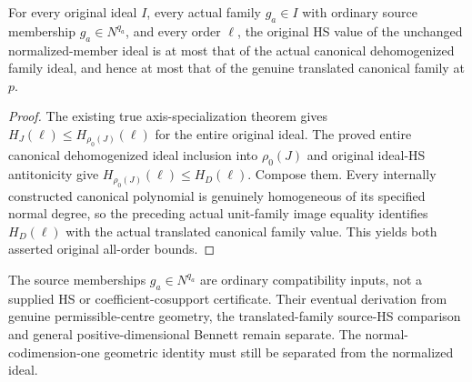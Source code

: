 \begin{theorem}
\label{hir:actual-normal-normalized-hs-le-translated-components}
For every original ideal $I$, every actual family $g_a\in I$ with
ordinary source membership $g_a\in N^{q_a}$, and every order $\ell$,
the original HS value of the unchanged normalized-member ideal is at
most that of the actual canonical dehomogenized family ideal, and
hence at most that of the genuine translated canonical family at $p$.
\leanok
\end{theorem}
\begin{proof}
The existing true axis-specialization theorem gives
$H_J(\ell)\le H_{\rho_0(J)}(\ell)$ for the entire original ideal.
The proved entire canonical dehomogenized ideal inclusion into
$\rho_0(J)$ and original ideal-HS antitonicity give
$H_{\rho_0(J)}(\ell)\le H_D(\ell)$. Compose them. Every internally
constructed canonical polynomial is genuinely homogeneous of its
specified normal degree, so the preceding actual unit-family image
equality identifies $H_D(\ell)$ with the actual translated canonical
family value. This yields both asserted original all-order bounds.
\end{proof}

The source memberships $g_a\in N^{q_a}$ are ordinary compatibility
inputs, not a supplied HS or coefficient-cosupport certificate. Their
eventual derivation from genuine permissible-centre geometry, the
translated-family source-HS comparison and general positive-dimensional
Bennett remain separate. The normal-codimension-one geometric identity
must still be separated from the normalized ideal.
